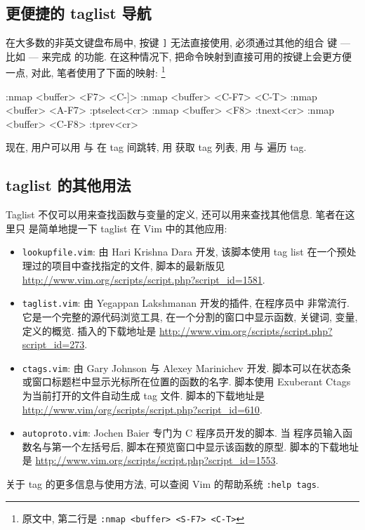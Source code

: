 \subsection{更便捷的 taglist 导航}
\label{subsec:easier_taglist_navigation}

在大多数的非英文键盘布局中, 按键 \texttt{]} 无法直接使用, 必须通过其他的组合
键 --- 比如  --- 来完成 \key{Ctrl+]} 的功能. 在这种情况下,
把命令映射到直接可用的按键上会更方便一点, 对此, 笔者使用了下面的映射:
\footnote{原文中, 第二行是 \texttt{:nmap <buffer> <S-F7> <C-T>}}
\begin{vimcode}
:nmap <buffer> <F7> <C-]>
:nmap <buffer> <C-F7> <C-T>
:nmap <buffer> <A-F7> :ptselect<cr>
:nmap <buffer> <F8> :tnext<cr>
:nmap <buffer> <C-F8> :tprev<cr>
\end{vimcode}
现在, 用户可以用  与  在 tag 间跳转, 用 
获取 tag 列表, 用  与  遍历 tag.

\subsection{taglist 的其他用法}
\label{subsec:other_usages_of_taglists}

Taglist 不仅可以用来查找函数与变量的定义, 还可以用来查找其他信息. 笔者在这里只
是简单地提一下 taglist 在 Vim 中的其他应用:
\begin{itemize}
    \item \texttt{lookupfile.vim}: 由 Hari Krishna Dara 开发, 该脚本使用 tag
        list 在一个预处理过的项目中查找指定的文件, 脚本的最新版见
        \url{http://www.vim.org/scripts/script.php?script_id=1581}.
    \item \texttt{taglist.vim}: 由 Yegappan Lakshmanan 开发的插件, 在程序员中
        非常流行. 它是一个完整的源代码浏览工具, 在一个分割的窗口中显示函数,
        关键词, 变量, 定义的概览. 插入的下载地址是
        \url{http://www.vim.org/scripts/script.php?script_id=273}.
    \item \texttt{ctags.vim}: 由 Gary Johnson 与 Alexey Marinichev 开发.
        脚本可以在状态条或窗口标题栏中显示光标所在位置的函数的名字. 脚本使用
        Exuberant Ctags 为当前打开的文件自动生成 tag 文件. 脚本的下载地址是
        \url{http://www.vim/org/scripts/script.php?script_id=610}.
    \item \texttt{autoproto.vim}: Jochen Baier 专门为 C 程序员开发的脚本. 当
        程序员输入函数名与第一个左括号后, 脚本在预览窗口中显示该函数的原型.
        脚本的下载地址是
        \url{http://www.vim.org/scripts/script.php?script_id=1553}.
\end{itemize}
\begin{warning}
    关于 tag 的更多信息与使用方法, 可以查阅 Vim 的帮助系统 \texttt{:help tags}.
\end{warning}

